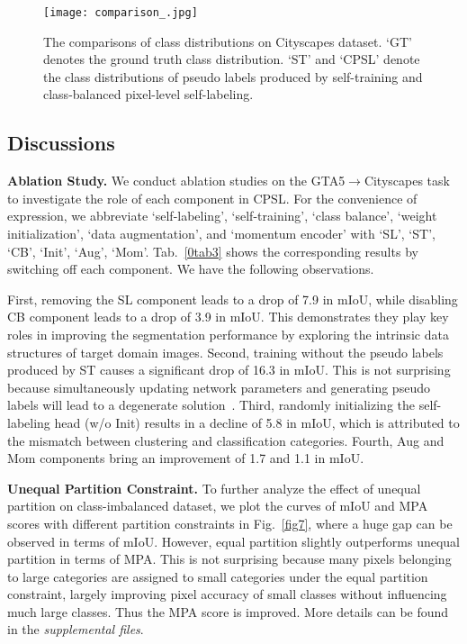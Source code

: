 \documentclass[10pt,twocolumn,letterpaper]{article}
\begin{document}
	\begin{figure}
		\vspace{-0.5em}
		\centering
		\texttt{[image: comparison\_.jpg]}\\
		\vspace{-1.0em}
		\caption{The comparisons of class distributions on Cityscapes dataset. `GT' denotes the ground truth class distribution. `ST' and `CPSL' denote the class distributions of pseudo labels produced by self-training and class-balanced pixel-level self-labeling.}
		\label{fig5}
		\vspace{-1em}
	\end{figure}
	
	\subsection{Discussions}
	\label{sec4.3}
	\noindent\textbf{Ablation Study.} We conduct ablation studies on the GTA5$\to$Cityscapes task to investigate the role of each component in CPSL. For the convenience of expression, we abbreviate `self-labeling', `self-training', `class balance', `weight initialization', `data augmentation', and `momentum encoder' with `SL', `ST', `CB', `Init', `Aug', `Mom'. Tab.~\ref{0tab3} shows the corresponding results by switching off each component. We have the following observations.
	
	First, removing the SL component leads to a drop of 7.9 in mIoU, while disabling CB component leads to a drop of 3.9 in mIoU. This demonstrates they play key roles in improving the segmentation performance by exploring the intrinsic data structures of target domain images. Second, training without the pseudo labels produced by ST causes a significant drop of 16.3 in mIoU. This is not surprising because simultaneously updating network parameters and generating pseudo labels will lead to a degenerate solution~\cite{zhang2021prototypical,zhang2019category}. Third, randomly initializing the self-labeling head (w/o Init) results in a decline of 5.8 in mIoU, which is attributed to the mismatch between clustering and classification categories. Fourth, Aug and Mom components bring an improvement of 1.7 and 1.1 in mIoU. 
	
	\vspace{0.1em}	\noindent\textbf{Unequal Partition Constraint.} To further analyze the effect of unequal partition on class-imbalanced dataset, we plot the curves of mIoU and MPA scores with different partition constraints in Fig.~\ref{fig7}, where a huge gap can be observed in terms of mIoU. However, equal partition slightly outperforms unequal partition in terms of MPA. This is not surprising because many pixels belonging to large categories are assigned to small categories under the equal partition constraint, largely improving pixel accuracy of small classes without influencing much large classes. Thus the MPA score is improved. More details can be found in the \textit{supplemental files}.
	
\end{document}
